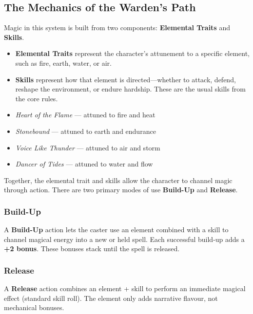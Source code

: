 \subsection{The Mechanics of the Warden’s Path}

Magic in this system is built from two components: \textbf{Elemental Traits} and \textbf{Skills}.

\begin{itemize}
    \item \textbf{Elemental Traits} represent the character’s attunement to a specific element, such as fire, earth, water, or air.
    \item \textbf{Skills} represent how that element is directed—whether to attack, defend, reshape the environment, or endure hardship. These are the usual skills from the core rules.
\end{itemize}

\begin{Example}
    \begin{itemize}
        \item \textit{Heart of the Flame} — attuned to fire and heat  
        \item \textit{Stonebound} — attuned to earth and endurance  
        \item \textit{Voice Like Thunder} — attuned to air and storm  
        \item \textit{Dancer of Tides} — attuned to water and flow  
    \end{itemize}
\end{Example}

Together, the elemental trait and skills allow the character to channel magic through action. There are two primary modes of use \textbf{Build-Up} and \textbf{Release}.

\subsubsection{Build-Up}
A \textbf{Build-Up} action lets the caster use an element combined with a skill to channel magical energy into a new or held spell. Each successful build-up adds a \textbf{+2 bonus}. These bonuses stack until the spell is released.


\subsubsection{Release}
A \textbf{Release} action combines an element + skill to perform an immediate magical effect (standard skill roll). The element only adds narrative flavour, not mechanical bonuses.


